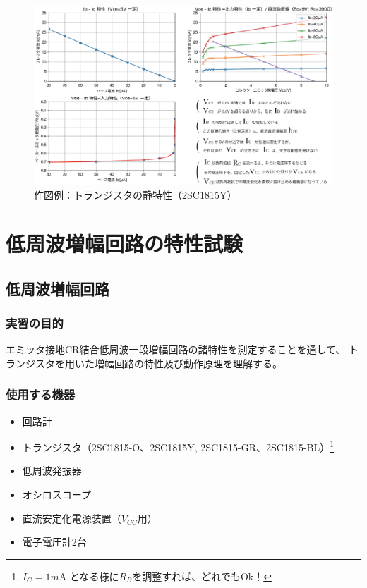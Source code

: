 \documentclass[uplatex,a4paper,11pt,oneside,openany]{jsbook}
\begin{document}
\begin{figure}[H]
  \centering
   \includegraphics[keepaspectratio, scale=0.7, angle=90]
               {figs/eps/statictate.eps}
               \caption{作図例：トランジスタの静特性（2SC1815Y）}
               \label{fig:staticexample}
\end{figure}

\part{低周波増幅回路の特性試験}

\chapter{低周波増幅回路}

\section{実習の目的}

エミッタ接地CR結合低周波一段増幅回路の諸特性を測定することを通して、
トランジスタを用いた増幅回路の特性及び動作原理を理解する。

\section{使用する機器}

\begin{itemize}
\item 回路計
\item トランジスタ（2SC1815-O、2SC1815Y, 2SC1815-GR、2SC1815-BL）\footnote{$I_C=1m$A となる様に$R_B$を調整すれば、どれでもOk！}
\item 低周波発振器
\item オシロスコープ
\item 直流安定化電源装置（$V_{CC}$用）
\item 電子電圧計2台
\end{itemize}
\end{document}
